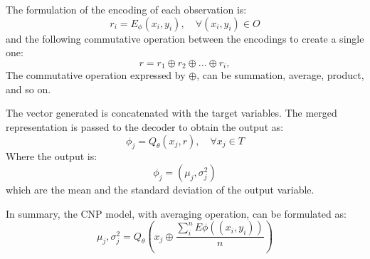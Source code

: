 The formulation of the encoding of each observation is:
\begin{equation}
r_i = E_\phi(x_i,y_i), \quad \forall(x_i,y_i) \in O
\end{equation}
and the following commutative operation between the encodings to create a single one: 
\begin{equation}
    r = r_1 \oplus r_2 \oplus ... \oplus r_i,
\end{equation}
The commutative operation expressed by $\oplus$, can be summation, average, product, and so on. 

The vector generated is concatenated with the target variables. The merged representation is passed to the decoder to obtain the output as:
\begin{equation}
    \phi_j = Q_\theta(x_j, r), \quad \forall x_j \in T
\end{equation}
Where the output is: 
\begin{equation}
    \phi_j = (\mu_j, \sigma_j^2)
\end{equation}
which are the mean and the standard deviation of the output variable.

In summary, the CNP model, with averaging operation, can be formulated as: 
\begin{equation}
    \mu_j, \sigma_j^2 = Q_\theta \left( x_j \oplus \frac{ \sum_{i}^{n} E\phi((x_i,y_i)) }{n}  \right)
\end{equation}

